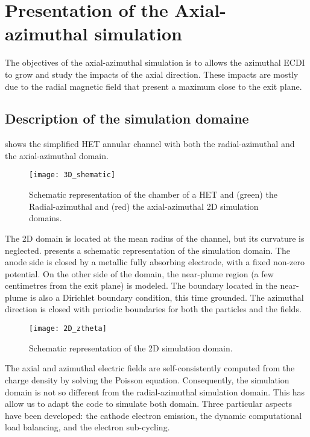 
\section{Presentation of the Axial-azimuthal simulation}

The objectives of the axial-azimuthal simulation is to allows the azimuthal \ac{ECDI} to grow and study the impacts of the axial direction.
These impacts are mostly due to the radial magnetic field  that present a maximum close to the exit plane.

\subsection{Description of the simulation domaine} \label{subsec-ztheta_description}
 shows the simplified \ac{HET} annular channel with both the radial-azimuthal and the axial-azimuthal \ztheta domain.

\begin{figure}[hbt]
  \centering
  \texttt{[image: 3D\_shematic]}
  \caption{Schematic representation of the chamber of a \ac{HET} and (green) the Radial-azimuthal and (red) the axial-azimuthal 2D simulation domains.}
  \label{fig-3Dschematic}
\end{figure}

The \ac{2D} \ztheta domain is located at the mean radius of the channel, but its curvature is neglected.
 presents a schematic representation of the \ztheta simulation domain.
The anode side is closed by a metallic fully absorbing electrode, with a fixed non-zero potential.
On the other side of the domain, the near-plume region (a few centimetres from the exit plane) is modeled.
The boundary located in the near-plume is also a Dirichlet boundary condition, this time grounded.
The azimuthal direction is closed with periodic boundaries for both the particles and the fields.

\begin{figure}[hbt]
  \centering
  \texttt{[image: 2D\_ztheta]}
  \caption{Schematic representation of the \ac{2D} \ztheta simulation domain.}
  \label{fig-2D_ztheta_bis}
\end{figure}

The axial and azimuthal electric fields are self-consistently computed from the charge density by solving the Poisson equation.
Consequently, the simulation domain is not so different from the radial-azimuthal simulation domain.
This has allow us to adapt the code \LPPic to simulate both domain.
Three particular aspects have been developed\string: the cathode electron emission, the dynamic computational load balancing, and the electron sub-cycling.

